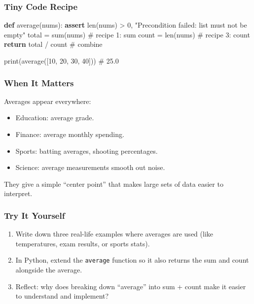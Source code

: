 \documentclass[
  letterpaper,
  DIV=11,
  numbers=noendperiod]{scrreprt}
\newenvironment{Shaded}{\begin{snugshade}}{\end{snugshade}}
\newcommand{\BuiltInTok}[1]{\textcolor[rgb]{0.00,0.23,0.31}{#1}}
\newcommand{\CommentTok}[1]{\textcolor[rgb]{0.37,0.37,0.37}{#1}}
\newcommand{\ControlFlowTok}[1]{\textcolor[rgb]{0.00,0.23,0.31}{\textbf{#1}}}
\newcommand{\DecValTok}[1]{\textcolor[rgb]{0.68,0.00,0.00}{#1}}
\newcommand{\KeywordTok}[1]{\textcolor[rgb]{0.00,0.23,0.31}{\textbf{#1}}}
\newcommand{\NormalTok}[1]{\textcolor[rgb]{0.00,0.23,0.31}{#1}}
\newcommand{\OperatorTok}[1]{\textcolor[rgb]{0.37,0.37,0.37}{#1}}
\newcommand{\StringTok}[1]{\textcolor[rgb]{0.13,0.47,0.30}{#1}}
\providecommand{\tightlist}{%
  \setlength{\itemsep}{0pt}\setlength{\parskip}{0pt}}
\begin{document}
\subsubsection{Tiny Code Recipe}\label{tiny-code-recipe-95}

\begin{Shaded}
\begin{Highlighting}[]
\KeywordTok{def}\NormalTok{ average(nums):}
    \ControlFlowTok{assert} \BuiltInTok{len}\NormalTok{(nums) }\OperatorTok{\textgreater{}} \DecValTok{0}\NormalTok{, }\StringTok{"Precondition failed: list must not be empty"}
\NormalTok{    total }\OperatorTok{=} \BuiltInTok{sum}\NormalTok{(nums)       }\CommentTok{\# recipe 1: sum}
\NormalTok{    count }\OperatorTok{=} \BuiltInTok{len}\NormalTok{(nums)       }\CommentTok{\# recipe 3: count}
    \ControlFlowTok{return}\NormalTok{ total }\OperatorTok{/}\NormalTok{ count    }\CommentTok{\# combine}

\BuiltInTok{print}\NormalTok{(average([}\DecValTok{10}\NormalTok{, }\DecValTok{20}\NormalTok{, }\DecValTok{30}\NormalTok{, }\DecValTok{40}\NormalTok{]))  }\CommentTok{\# 25.0}
\end{Highlighting}
\end{Shaded}

\subsubsection{When It Matters}\label{when-it-matters-95}

Averages appear everywhere:

\begin{itemize}
\tightlist
\item
  Education: average grade.
\item
  Finance: average monthly spending.
\item
  Sports: batting averages, shooting percentages.
\item
  Science: average measurements smooth out noise.
\end{itemize}

They give a simple ``center point'' that makes large sets of data easier
to interpret.

\subsubsection{Try It Yourself}\label{try-it-yourself-97}

\begin{enumerate}
\def\labelenumi{\arabic{enumi}.}
\tightlist
\item
  Write down three real-life examples where averages are used (like
  temperatures, exam results, or sports stats).
\item
  In Python, extend the \texttt{average} function so it also returns the
  sum and count alongside the average.
\item
  Reflect: why does breaking down ``average'' into sum + count make it
  easier to understand and implement?
\end{enumerate}
\end{document}
